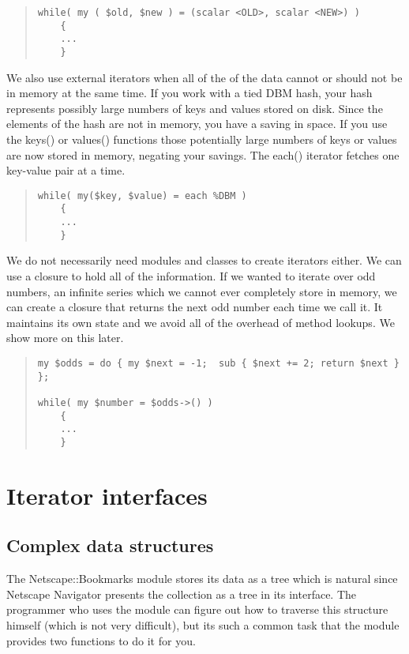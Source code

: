 \begin{quote}
\begin{verbatim}
while( my ( $old, $new ) = (scalar <OLD>, scalar <NEW>) )
    {
    ...
    }
\end{verbatim}
\end{quote}

We also use external iterators when all of the of the data cannot or
should not be in memory at the same time. If you work with a tied DBM
hash, your hash represents possibly large numbers of keys and values
stored on disk.  Since the elements of the hash are not in memory, you
have a saving in space.  If you use the keys() or values() functions
those potentially large numbers of keys or values are now stored in
memory, negating your savings. The each() iterator fetches one
key-value pair at a time.

\begin{quote}
\begin{verbatim}
while( my($key, $value) = each %DBM )
    {
    ...
    }
\end{verbatim}
\end{quote}
        
We do not necessarily need modules and classes to create iterators
either.  We can use a closure to hold all of the information.
If we wanted to iterate over odd numbers, an infinite series
which we cannot ever completely store in memory, we can
create a closure that returns the next odd number each time we
call it.  It maintains its own state and we avoid all of the 
overhead of method lookups.  We show more on this later.

\begin{quote}
\begin{verbatim}
my $odds = do { my $next = -1;  sub { $next += 2; return $next } };

while( my $number = $odds->() )
    {
    ...
    }
\end{verbatim}
\end{quote}
    
    \section{Iterator interfaces}
    
    \subsection{Complex data structures}
    
The Netscape::Bookmarks module stores its data as a tree which is natural
since Netscape Navigator presents the collection as a tree in its interface.
The programmer who uses the module can figure out how to traverse this
structure himself (which is not very difficult), but its such a common
task that the module provides two functions to do it for you.

